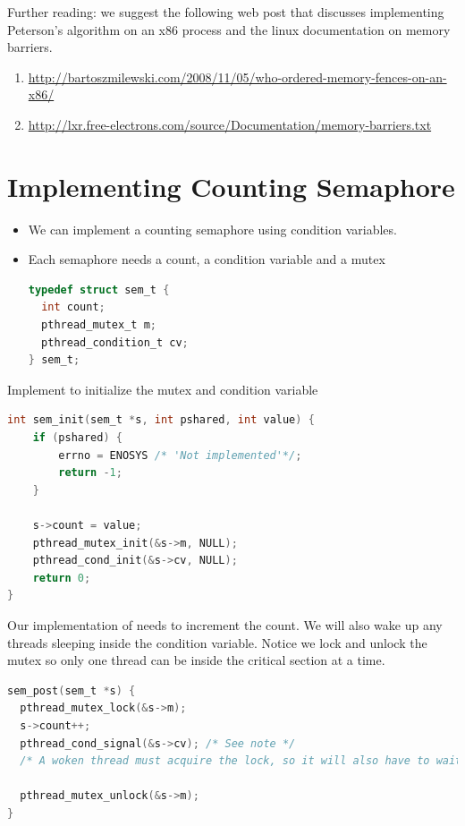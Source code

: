 Further reading: we suggest the following web post that discusses implementing Peterson's algorithm on an x86 process and the linux documentation on memory barriers.
\begin{enumerate}
\item \href{Memory Fences}{http://bartoszmilewski.com/2008/11/05/who-ordered-memory-fences-on-an-x86/}
\item \href{Memory Barriers}{http://lxr.free-electrons.com/source/Documentation/memory-barriers.txt}
\end{enumerate}


\section{Implementing Counting Semaphore}\label{implementing-counting-semaphore}

\begin{itemize}
\item
  We can implement a counting semaphore using condition variables.
\item
  Each semaphore needs a count, a condition variable and a mutex

\begin{lstlisting}[language=C]
typedef struct sem_t {
  int count; 
  pthread_mutex_t m;
  pthread_condition_t cv;
} sem_t;
\end{lstlisting}
\end{itemize}

Implement  to initialize the mutex and condition variable

\begin{lstlisting}[language=C]
int sem_init(sem_t *s, int pshared, int value) {
    if (pshared) { 
        errno = ENOSYS /* 'Not implemented'*/; 
        return -1;
    }

    s->count = value;
    pthread_mutex_init(&s->m, NULL);
    pthread_cond_init(&s->cv, NULL);
    return 0;
}
\end{lstlisting}

Our implementation of  needs to increment the count. We will also wake up any threads sleeping inside the condition variable. Notice we lock and unlock the mutex so only one thread can be inside the critical section at a time.

\begin{lstlisting}[language=C]
sem_post(sem_t *s) {
  pthread_mutex_lock(&s->m);
  s->count++;
  pthread_cond_signal(&s->cv); /* See note */
  /* A woken thread must acquire the lock, so it will also have to wait until we call unlock*/

  pthread_mutex_unlock(&s->m);
}
\end{lstlisting}

